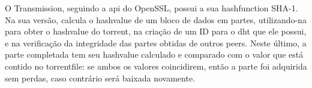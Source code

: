 O Transmission, seguindo a \gls{api} do OpenSSL, possui a sua \gls*{hashfunction}
SHA-1. Na sua versão, calcula o \gls*{hashvalue} de um bloco de dados em partes,
utilizando-na para obter o \gls*{hashvalue} do \gls*{torrent}, na criação de um ID para
o \gls*{dht} que ele possui, e na verificação da integridade das partes obtidas de
outros \glspl*{peer}. Neste último, a parte completada tem seu \gls*{hashvalue}
calculado e comparado com o valor que está contido no \gls*{torrentfile}: se ambos os
valores coincidirem, então a parte foi adquirida sem perdas, caso contrário será baixada
novamente.


